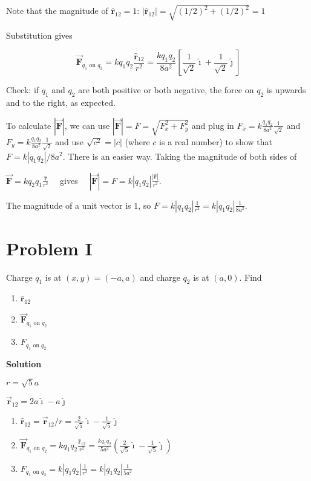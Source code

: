 \documentclass{article}
\newcommand{\ds}[0]{\displaystyle}
\newcommand{\ihat}[0]{\hat{\boldsymbol{\imath}}}
\newcommand{\jhat}[0]{\hat{\boldsymbol{\jmath}}}
\newcommand{\rhat}[0]{\hat{\mathbf{r}}}
\newcommand{\bfvec}[1]{\vec{\mathbf{#1}}}
\begin{document}
Note that the magnitude of $\rhat_{12}=1$: $|\rhat_{12}|=\sqrt{(1/2)^2+(1/2)^2}=1$

Substitution gives

$$\bfvec{F}_{q_1\text{ on }q_2}=kq_1q_2\frac{\rhat_{12}}{r^2} = \frac{kq_1q_2}{8a^2}\left[\frac{1}{\sqrt{2}}\ihat + \frac{1}{\sqrt{2}}\jhat\right]$$

Check: if $q_1$ and $q_2$ are both positive or both negative, the force on $q_2$ is upwards and to the right, as expected.

To calculate $|\bfvec{F}|$, we can use $|\bfvec{F}|=F=\sqrt{F_x^2+F_y^2}$ and plug in $F_x=k\frac{q_1q_2}{8a^2}\frac{1}{\sqrt{2}}$ and $F_y=k\frac{q_1q_2}{8a^2}\frac{1}{\sqrt{2}}$ and use $\sqrt{c^2}=|c|$ (where $c$ is a real number) to show that $F=k|q_1q_2|/{8a^2}$. There is an easier way. Taking the magnitude of both sides of

$\ds\bfvec{F}=kq_2q_1\frac{\rhat}{r^2}\quad$
gives
$\quad\ds|\bfvec{F}|=F=k|q_1q_2|\frac{|\rhat|}{r^2}$.

The magnitude of a unit vector is $1$, so
$\ds F=k|q_1q_2|\frac{1}{r^2}=k|q_1q_2|\frac{1}{8a^2}$.

\newpage

\section{Problem I}

Charge $q_1$ is at $(x,y)=(-a,a)$ and charge $q_2$ is at $(a, 0)$. Find

\begin{enumerate}

  \item $\rhat_{12}$

  \item $\bfvec{F}_{q_1\text{ on }q_2}$

  \item $F_{q_1\text{ on }q_2}$

\end{enumerate}

\ifsolutions
\textbf{Solution}

$r = \sqrt{5}a$

$\bfvec{r}_{12}=2a\ihat-a\jhat$

    \begin{enumerate}

      \item $\rhat_{12}=\bfvec{r}_{12}/r=\frac{2}{\sqrt{5}}\ihat-\frac{1}{\sqrt{5}}\jhat$

      \item $\ds\bfvec{F}_{q_1\text{ on }q_2}=kq_1q_2\frac{\rhat_{12}}{r^2}=\frac{kq_1q_2}{5a^2}\left(\frac{2}{\sqrt{5}}\ihat-\frac{1}{\sqrt{5}}\jhat\right)$

      \item $\ds F_{q_1\text{ on }q_2} = k|q_1q_2|\frac{1}{r^2}= k|q_1q_2|\frac{1}{5a^2}$

    \end{enumerate}
\else
\end{document}
